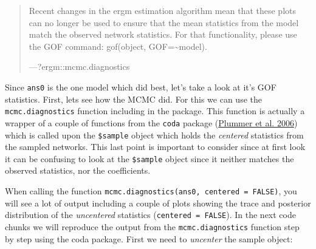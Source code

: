 \documentclass[
]{book}
\newenvironment{Shaded}{\begin{snugshade}}{\end{snugshade}}
\newcommand{\AttributeTok}[1]{\textcolor[rgb]{0.77,0.63,0.00}{#1}}
\newcommand{\CommentTok}[1]{\textcolor[rgb]{0.56,0.35,0.01}{\textit{#1}}}
\newcommand{\ConstantTok}[1]{\textcolor[rgb]{0.00,0.00,0.00}{#1}}
\newcommand{\ControlFlowTok}[1]{\textcolor[rgb]{0.13,0.29,0.53}{\textbf{#1}}}
\newcommand{\DecValTok}[1]{\textcolor[rgb]{0.00,0.00,0.81}{#1}}
\newcommand{\FunctionTok}[1]{\textcolor[rgb]{0.00,0.00,0.00}{#1}}
\newcommand{\NormalTok}[1]{#1}
\newcommand{\OtherTok}[1]{\textcolor[rgb]{0.56,0.35,0.01}{#1}}
\newcommand{\SpecialCharTok}[1]{\textcolor[rgb]{0.00,0.00,0.00}{#1}}
\begin{document}
\begin{quote}
Recent changes in the ergm estimation algorithm mean that these plots can no longer be used to ensure that the mean statistics from the model match the observed network statistics. For that functionality, please use the GOF command: gof(object, GOF=\textasciitilde model).

---?ergm::mcmc.diagnostics
\end{quote}

Since \texttt{ans0} is the one model which did best, let's take a look at it's GOF statistics. First, lets see how the MCMC did. For this we can use the \texttt{mcmc.diagnostics} function including in the package. This function is actually a wrapper of a couple of functions from the \texttt{coda} package (\protect\hyperlink{ref-R-coda}{Plummer et al. 2006}) which is called upon the \texttt{\$sample} object which holds the \emph{centered} statistics from the sampled networks. This last point is important to consider since at first look it can be confusing to look at the \texttt{\$sample} object since it neither matches the observed statistics, nor the coefficients.

When calling the function \texttt{mcmc.diagnostics(ans0,\ centered\ =\ FALSE)}, you will see a lot of output including a couple of plots showing the trace and posterior distribution of the \emph{uncentered} statistics (\texttt{centered\ =\ FALSE}). In the next code chunks we will reproduce the output from the \texttt{mcmc.diagnostics} function step by step using the coda package. First we need to \emph{uncenter} the sample object:

\begin{Shaded}
\end{Shaded}
\end{document}
